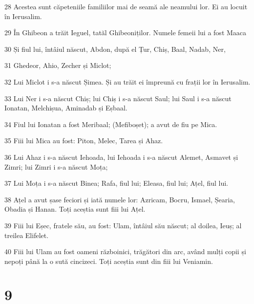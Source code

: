 \par 28 Acestea sunt căpeteniile familiilor mai de seamă ale neamului lor. Ei au locuit în Ierusalim.
\par 29 În Ghibeon a trăit Ieguel, tatăl Ghibeoniților. Numele femeii lui a fost Maaca
\par 30 Și fiul lui, întâiul născut, Abdon, după el Țur, Chiș, Baal, Nadab, Ner,
\par 31 Ghedeor, Ahio, Zecher și Miclot;
\par 32 Lui Miclot i s-a născut Șimea. Și au trăit ei împreună cu frații lor în Ierusalim.
\par 33 Lui Ner i s-a născut Chiș; lui Chiș i s-a născut Saul; lui Saul i s-a născut Ionatan, Melchișua, Aminadab și Eșbaal.
\par 34 Fiul lui Ionatan a fost Meribaal; (Mefiboșet); a avut de fiu pe Mica.
\par 35 Fiii lui Mica au fost: Piton, Melec, Tarea și Ahaz.
\par 36 Lui Ahaz i s-a născut Iehoada, lui Iehoada i s-a născut Alemet, Asmavet și Zimri; lui Zimri i s-a născut Moța;
\par 37 Lui Moța i s-a născut Binea; Rafa, fiul lui; Eleasa, fiul lui; Ațel, fiul lui.
\par 38 Ațel a avut șase feciori și iată numele lor: Azricam, Bocru, Ismael, Șearia, Obadia și Hanan. Toți aceștia sunt fiii lui Ațel.
\par 39 Fiii lui Eșec, fratele său, au fost: Ulam, întâiul său născut; al doilea, Ieuș; al treilea Elifelet.
\par 40 Fiii lui Ulam au fost oameni războinici, trăgători din arc, având mulți copii și nepoți până la o sută cincizeci. Toți aceștia sunt din fiii lui Veniamin.

\chapter{9}


